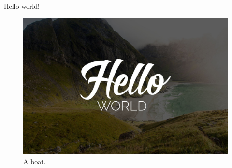 \documentclass[a4paper]{article}
\begin{document}
Hello world!
\begin{figure}
  \includegraphics[width=\linewidth]{images/HelloWorld.jpg}
  \caption{A boat.}
  \label{fig:boat1}
\end{figure}
\end{document}
